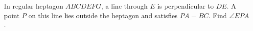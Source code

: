 In regular heptagon $ABCDEFG$, a line through $E$ is perpendicular to $DE$. A point $P$ on this line lies outside the heptagon and satisfies $PA=BC$. Find $\angle EPA$.
